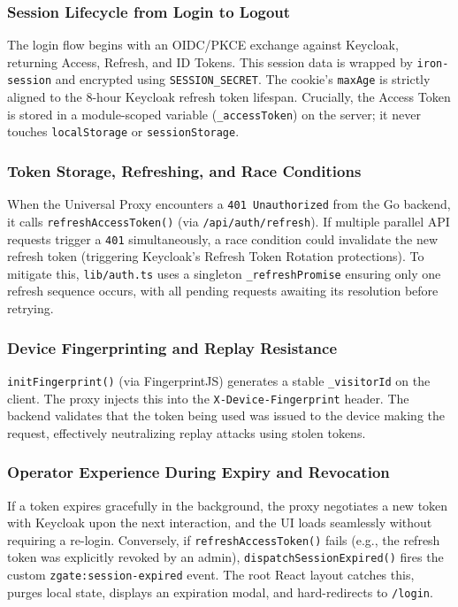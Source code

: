 \subsubsection{Session Lifecycle from Login to Logout}
The login flow begins with an OIDC/PKCE exchange against Keycloak, returning Access, Refresh, and ID Tokens. This session data is wrapped by \texttt{iron-session} and encrypted using \texttt{SESSION\_SECRET}. The cookie's \texttt{maxAge} is strictly aligned to the 8-hour Keycloak refresh token lifespan. Crucially, the Access Token is stored in a module-scoped variable (\texttt{\_accessToken}) on the server; it never touches \texttt{localStorage} or \texttt{sessionStorage}.

\subsubsection{Token Storage, Refreshing, and Race Conditions}
When the Universal Proxy encounters a \texttt{401 Unauthorized} from the Go backend, it calls \texttt{refreshAccessToken()} (via \texttt{/api/auth/refresh}). If multiple parallel API requests trigger a \texttt{401} simultaneously, a race condition could invalidate the new refresh token (triggering Keycloak's Refresh Token Rotation protections). To mitigate this, \texttt{lib/auth.ts} uses a singleton \texttt{\_refreshPromise} ensuring only one refresh sequence occurs, with all pending requests awaiting its resolution before retrying.

\subsubsection{Device Fingerprinting and Replay Resistance}
\texttt{initFingerprint()} (via FingerprintJS) generates a stable \texttt{\_visitorId} on the client. The proxy injects this into the \texttt{X-Device-Fingerprint} header. The backend validates that the token being used was issued to the device making the request, effectively neutralizing replay attacks using stolen tokens.

\subsubsection{Operator Experience During Expiry and Revocation}
If a token expires gracefully in the background, the proxy negotiates a new token with Keycloak upon the next interaction, and the UI loads seamlessly without requiring a re-login. Conversely, if \texttt{refreshAccessToken()} fails (e.g., the refresh token was explicitly revoked by an admin), \texttt{dispatchSessionExpired()} fires the custom \texttt{zgate:session-expired} event. The root React layout catches this, purges local state, displays an expiration modal, and hard-redirects to \texttt{/login}.

